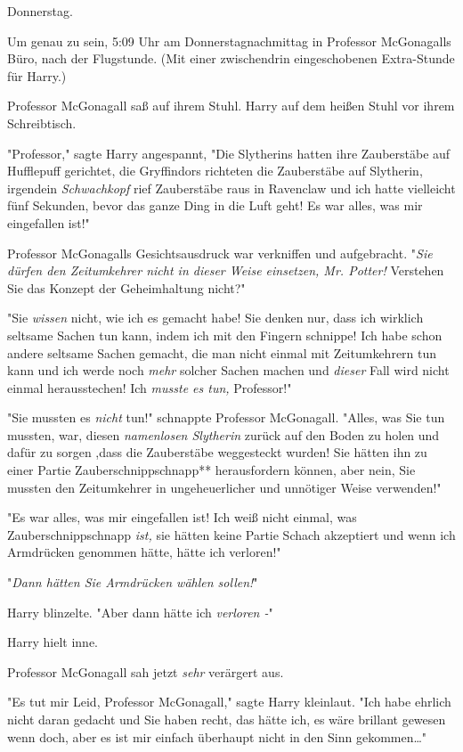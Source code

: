{\later

Donnerstag.

Um genau zu sein, 5:09 Uhr am Donnerstagnachmittag in Professor McGonagalls Büro, nach der Flugstunde. (Mit einer zwischendrin eingeschobenen Extra-Stunde für Harry.)

Professor McGonagall saß auf ihrem Stuhl. Harry auf dem heißen Stuhl vor ihrem Schreibtisch.

"Professor," sagte Harry angespannt, "Die Slytherins hatten ihre Zauberstäbe auf Hufflepuff gerichtet, die Gryffindors richteten die Zauberstäbe auf Slytherin, irgendein \emph{Schwachkopf} rief Zauberstäbe raus in Ravenclaw und ich hatte vielleicht fünf Sekunden, bevor das ganze Ding in die Luft geht! Es war alles, was mir eingefallen ist!"

Professor McGonagalls Gesichtsausdruck war verkniffen und aufgebracht. "\emph{Sie dürfen den Zeitumkehrer nicht in dieser Weise einsetzen, Mr. Potter!} Verstehen Sie das Konzept der Geheimhaltung nicht?"

"Sie \emph{wissen} nicht, wie ich es gemacht habe! Sie denken nur, dass ich wirklich seltsame Sachen tun kann, indem ich mit den Fingern schnippe! Ich habe schon andere seltsame Sachen gemacht, die man nicht einmal mit Zeitumkehrern tun kann und ich werde noch \emph{mehr} solcher Sachen machen und \emph{dieser} Fall wird nicht einmal herausstechen! Ich \emph{musste es tun,} Professor!"

"Sie mussten es \emph{nicht} tun!" schnappte Professor McGonagall. "Alles, was Sie tun mussten, war, diesen \emph{namenlosen Slytherin} zurück auf den Boden zu holen und dafür zu sorgen ,dass die Zauberstäbe weggesteckt wurden! Sie hätten ihn zu einer Partie Zauberschnippschnapp** herausfordern können, aber nein, Sie mussten den Zeitumkehrer in ungeheuerlicher und unnötiger Weise verwenden!"

"Es war alles, was mir eingefallen ist! Ich weiß nicht einmal, was Zauberschnippschnapp \emph{ist,} sie hätten keine Partie Schach akzeptiert und wenn ich Armdrücken genommen hätte, hätte ich verloren!"

"\emph{Dann hätten Sie Armdrücken wählen sollen!}"

Harry blinzelte. "Aber dann hätte ich \emph{verloren -}"

Harry hielt inne.

Professor McGonagall sah jetzt \emph{sehr} verärgert aus.

"Es tut mir Leid, Professor McGonagall," sagte Harry kleinlaut. "Ich habe ehrlich nicht daran gedacht und Sie haben recht, das hätte ich, es wäre brillant gewesen wenn doch, aber es ist mir einfach überhaupt nicht in den Sinn gekommen…"

}
